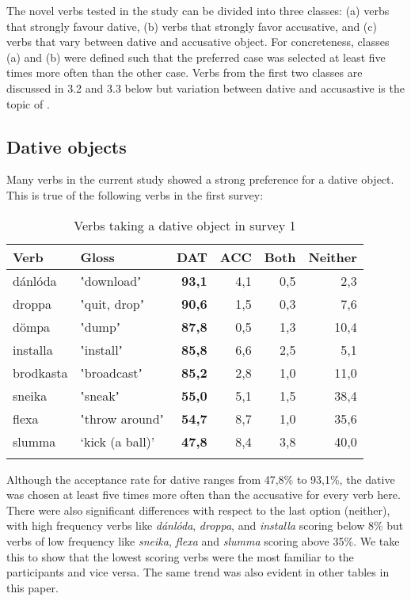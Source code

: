 \documentclass[output=paper,modfonts,nonflat,colorlinks,citecolor=brown]{langsci/langscibook}
\begin{document}
{The novel verbs tested in the study can be divided into three classes: (a) verbs that strongly favour dative, (b) verbs that strongly favor accusative, and (c) verbs that vary between dative and accusative object. For concreteness, classes (a) and (b) were defined such that the preferred case was selected at least five times more often than the other case. Verbs from the first two classes are discussed in 3.2 and 3.3 below but variation between dative and accusastive is the topic of .

\subsection{Dative objects} %

Many verbs in the current study showed a strong preference for a dative object. This is true of the following verbs in the first survey: 

\begin{table}
\caption{\label{tab:jonsson:1}Verbs taking a dative object in survey 1}
\begin{tabularx}{\textwidth}{XXrrrr}
\lsptoprule
Verb & Gloss & \textbf{DAT} & ACC & Both & Neither\\
\midrule
dánlóda & ʽdownloadʼ & \textbf{93,1} & 4,1 & 0,5 & 2,3\\
droppa & ʽquit, dropʼ & \textbf{90,6} & 1,5 & 0,3 & 7,6\\
dömpa & ʽdumpʼ & \textbf{87,8} & 0,5 & 1,3 & 10,4\\
installa & ʽinstallʼ & \textbf{85,8} & 6,6 & 2,5 & 5,1\\
brodkasta & ʽbroadcastʼ & \textbf{85,2} & 2,8 & 1,0 & 11,0\\
sneika & ʽsneakʼ & \textbf{55,0} & 5,1 & 1,5 & 38,4\\
flexa & ʽthrow aroundʼ & \textbf{54,7} & 8,7 & 1,0 & 35,6\\
slumma & ‘kick (a ball)’ & \textbf{47,8} & 8,4 & 3,8 & 40,0\\
\lspbottomrule
\end{tabularx}
\end{table}

Although the acceptance rate for dative ranges from 47,8\% to 93,1\%, the dative was chosen at least five times more often than the accusative for every verb here. There were also significant differences with respect to the last option (neither), with high frequency verbs like \textit{dánlóda}, \textit{droppa}, and \textit{installa} scoring below 8\% but verbs of low frequency like \textit{sneika}, \textit{flexa} and \textit{slumma} scoring above 35\%. We take this to show that the lowest scoring verbs were the most familiar to the participants and vice versa. The same trend was also evident in other tables in this paper.

}
\end{document}
